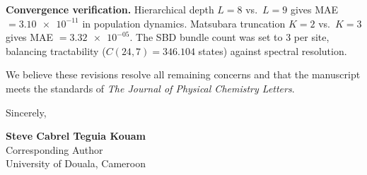 \documentclass[11pt]{article}
\begin{document}
\textbf{Convergence verification.} Hierarchical depth $L=8$ vs.\ $L=9$ gives MAE $= \num{3.10e-11}$ in population dynamics. Matsubara truncation $K=2$ vs.\ $K=3$ gives MAE $= \num{3.32e-05}$. The SBD bundle count was set to 3 per site, balancing tractability ($C(24,7) = \num{346,104}$ states) against spectral resolution.

We believe these revisions resolve all remaining concerns and that the manuscript meets the standards of \textit{The Journal of Physical Chemistry Letters}.

\vspace{1.5em}

\noindent Sincerely,

\vspace{2.5em}

\noindent \textbf{Steve Cabrel Teguia Kouam}\\
Corresponding Author\\
University of Douala, Cameroon
\end{document}
